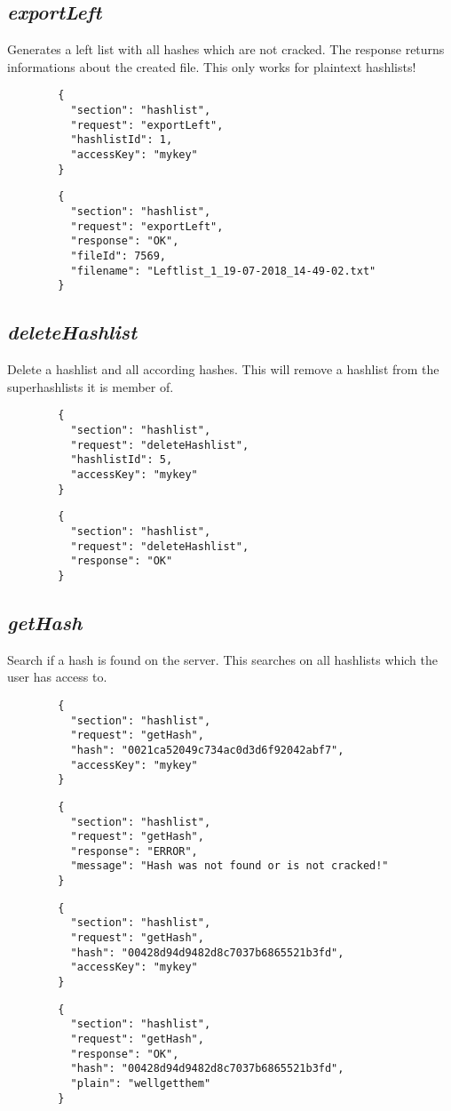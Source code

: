 \subsection*{\textit{exportLeft}}
	Generates a left list with all hashes which are not cracked. The response returns informations about the created file. This only works for plaintext hashlists!
	{
		\color{blue}
		\begin{verbatim}
		{
		  "section": "hashlist",
		  "request": "exportLeft",
		  "hashlistId": 1,
		  "accessKey": "mykey"
		}
		\end{verbatim}
	}
	{
		\color{OliveGreen}
		\begin{verbatim}
		{
		  "section": "hashlist",
		  "request": "exportLeft",
		  "response": "OK",
		  "fileId": 7569,
		  "filename": "Leftlist_1_19-07-2018_14-49-02.txt"
		}
		\end{verbatim}
	}
\subsection*{\textit{deleteHashlist}}
	Delete a hashlist and all according hashes. This will remove a hashlist from the superhashlists it is member of.
	{
		\color{blue}
		\begin{verbatim}
		{
		  "section": "hashlist",
		  "request": "deleteHashlist",
		  "hashlistId": 5,
		  "accessKey": "mykey"
		}
		\end{verbatim}
	}
	{
		\color{OliveGreen}
		\begin{verbatim}
		{
		  "section": "hashlist",
		  "request": "deleteHashlist",
		  "response": "OK"
		}
		\end{verbatim}
	}
\subsection*{\textit{getHash}}
	Search if a hash is found on the server. This searches on all hashlists which the user has access to.
	{
		\color{blue}
		\begin{verbatim}
		{
		  "section": "hashlist",
		  "request": "getHash",
		  "hash": "0021ca52049c734ac0d3d6f92042abf7",
		  "accessKey": "mykey"
		}
		\end{verbatim}
	}
	{
		\color{OliveGreen}
		\begin{verbatim}
		{
		  "section": "hashlist",
		  "request": "getHash",
		  "response": "ERROR",
		  "message": "Hash was not found or is not cracked!"
		}
		\end{verbatim}
	}
	{
		\color{blue}
		\begin{verbatim}
		{
		  "section": "hashlist",
		  "request": "getHash",
		  "hash": "00428d94d9482d8c7037b6865521b3fd",
		  "accessKey": "mykey"
		}
		\end{verbatim}
	}
	{
		\color{OliveGreen}
		\begin{verbatim}
		{
		  "section": "hashlist",
		  "request": "getHash",
		  "response": "OK",
		  "hash": "00428d94d9482d8c7037b6865521b3fd",
		  "plain": "wellgetthem"
		}
		\end{verbatim}
	}







 